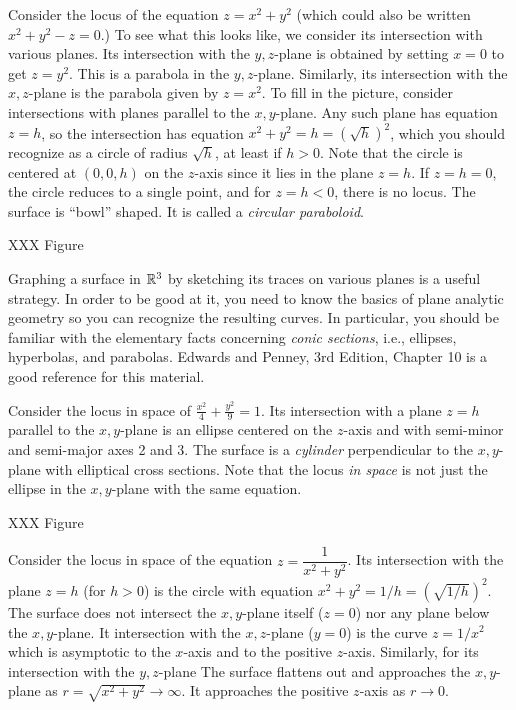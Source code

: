 \begin{example}
	Consider the locus of the equation $z = x^2 + y^2$ (which could
	also be written $x^2 + y^2 - z = 0$.)  To see what this looks like,
	we consider its intersection with various planes.   Its intersection
	with the $y,z$-plane is obtained by setting $x = 0$ to get
	$z = y^2$.  This is a parabola in the $y,z$-plane.  
	Similarly, its intersection with the $x,z$-plane is the parabola
	given by $z = x^2$.   To fill in the picture,  consider
	intersections with planes parallel to the $x,y$-plane.  Any
	such plane has equation $z = h$, so the intersection has equation
	$x^2 + y^2 = h = (\sqrt h)^2$, which you should recognize as a circle
	of radius $\sqrt h$, at least if $h > 0$.  Note that the circle is
	centered at $(0,0,h)$ on the $z$-axis since it lies in the plane $z = h$.
	If $z = h = 0$, the circle reduces to a single point, and for 
	$z = h < 0$, there is no locus.
	The surface is ``bowl'' shaped.  It is called a \emph{circular
	paraboloid}.

	XXX Figure
\end{example}

Graphing a surface in $\mathbb{R}^3$ by sketching its traces on various
planes is a useful strategy.  In order to be good at it, you need
to know the basics of plane analytic geometry so you can recognize
the resulting curves.  In particular, you should be familiar with
the elementary facts concerning \emph{conic sections}, i.e.,
ellipses, hyperbolas, and parabolas.   Edwards and Penney, 3rd Edition,
Chapter 10 is a good reference for this material.

\begin{example}
	Consider the locus in space of $\displaystyle{\frac{x^2}4 +
	\frac{y^2} 9} = 1$.   Its intersection with a plane $z = h$
	parallel to the $x,y$-plane is an ellipse centered on the $z$-axis
	and with semi-minor and semi-major axes  2 and 3.   The surface
	is a \emph{cylinder} perpendicular to the $x,y$-plane with
	elliptical cross sections.
	Note that the locus \emph{in space} is not just the ellipse
	in the $x,y$-plane with the same equation.
	
	XXX Figure
\end{example}

\begin{example}
	Consider the locus in space of the equation
	$z = \dfrac 1{x^2 + y^2}$.   Its intersection with the plane $z = h$
	(for $h > 0$) is the circle with equation
	$ x^2 + y^2 = 1/h = (\sqrt{1/h})^2$.   The surface does not intersect
	the $x,y$-plane itself ($z = 0$) nor any plane below the $x,y$-plane.
	It intersection with the $x,z$-plane ($y = 0$) is the curve
	$z = 1/x^2$ which is asymptotic to the $x$-axis
	and to the positive $z$-axis.  Similarly, for its intersection
	with the $y,z$-plane   The surface flattens out and approaches the
	$x,y$-plane as $r = \sqrt{x^2 + y^2} \to \infty$.  It approaches the
	positive $z$-axis as $r \to 0$.
\end{example}

